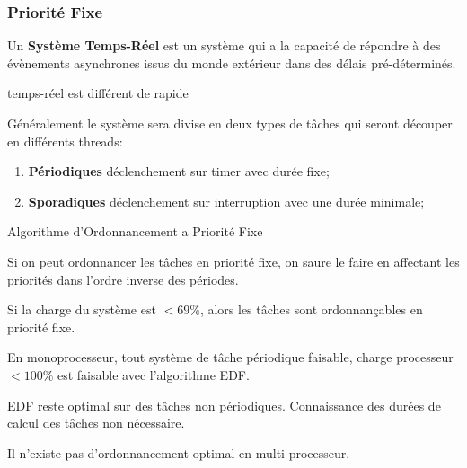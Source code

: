\documentclass{article}
\begin{document}
\subsubsection*{Priorité Fixe}
\begin{definition}
    Un \textbf{Système Temps-Réel} est un système qui a la capacité de répondre à des évènements asynchrones issus du monde extérieur dans des délais pré-déterminés.
    \begin{phrase}
        temps-réel est différent de rapide
    \end{phrase}
    Généralement le système sera divise en deux types de tâches qui seront découper en différents threads:
    \begin{enumerate}[noitemsep]
        \item \textbf{Périodiques} déclenchement sur timer avec durée fixe;
        \item \textbf{Sporadiques} déclenchement sur interruption avec une durée minimale;
    \end{enumerate}
\end{definition}
\begin{definition}
    Algorithme d'Ordonnancement a Priorité Fixe
    \begin{theorem}
        Si on peut ordonnancer les tâches en priorité fixe, on saure le faire en affectant les priorités dans l'ordre inverse des périodes.
    \end{theorem}

    \begin{theorem}
        Si la charge du système est $<69\%$, alors les tâches sont ordonnançables en priorité fixe.
    \end{theorem}

    \begin{theorem}
        En monoprocesseur, tout système de tâche périodique faisable, charge processeur $<100\%$ est faisable avec l'algorithme EDF.        
    \end{theorem}

    \begin{remark}
        EDF reste optimal sur des tâches non périodiques. Connaissance des durées de calcul des tâches non nécessaire.
    \end{remark}    
    \begin{phrase}
        Il n'existe pas d'ordonnancement optimal en multi-processeur.
    \end{phrase}
\end{definition}
\end{document}
